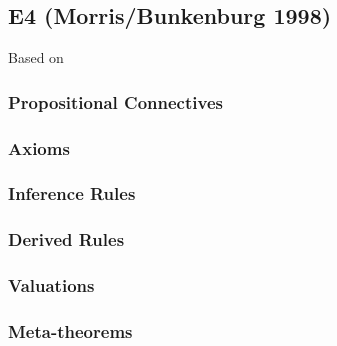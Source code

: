 \subsection{\textbf{E4} (Morris/Bunkenburg 1998)}
Based on \cite{MB98}


\subsubsection{Propositional Connectives}


\subsubsection{Axioms}


\subsubsection{Inference Rules}


\subsubsection{Derived Rules}


\subsubsection{Valuations}


\subsubsection{Meta-theorems}

